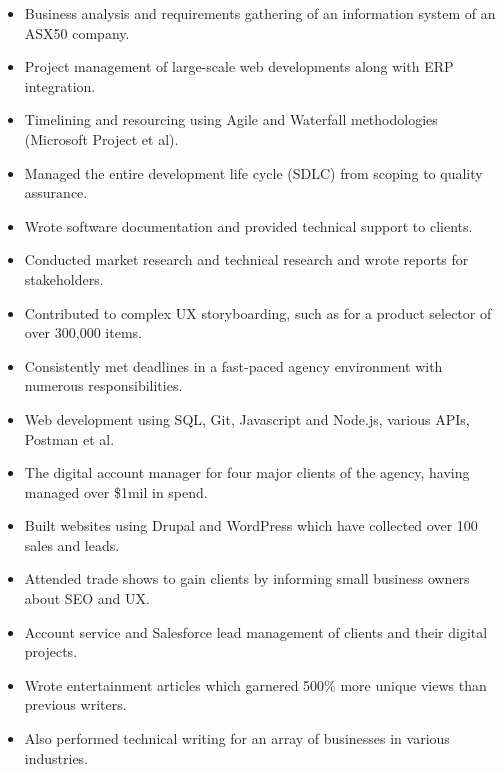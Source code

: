 \documentclass{resume}
\begin{document}
\begin{flushleft}


    \begin{itemize}
    \item Business analysis and requirements gathering of an information system of an ASX50 company.
    \item Project management of large-scale web developments along with ERP integration.
    \item Timelining and resourcing using Agile and Waterfall methodologies (Microsoft Project et al).
    \item Managed the entire development life cycle (SDLC) from scoping to quality assurance.
    \item Wrote software documentation and provided technical support to clients.
    \item Conducted market research and technical research and wrote reports for stakeholders.
    \item Contributed to complex UX storyboarding, such as for a product selector of over 300,000 items.
    \item Consistently met deadlines in a fast-paced agency environment with numerous responsibilities.
    \item Web development using SQL, Git, Javascript and Node.js, various APIs, Postman et al.
    \item The digital account manager for four major clients of the agency, having managed over \$1mil in spend.
    \end{itemize}


    \begin{itemize}
    \item Built websites using Drupal and WordPress which have collected over 100 sales and leads.
    \item Attended trade shows to gain clients by informing small business owners about SEO and UX.
    \end{itemize}


    \begin{itemize}
    \item Account service and Salesforce lead management of clients and their digital projects.
    \item Wrote entertainment articles which garnered 500\% more unique views than previous writers.
    \item Also performed technical writing for an array of businesses in various industries.
    \end{itemize}

\end{flushleft}
\end{document}
